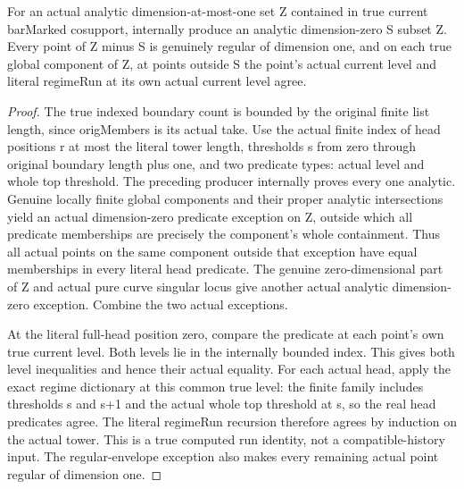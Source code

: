 \begin{theorem}
\label{hir:step-one-actual-curve-history-dimzero-exception}
\leanok
For an actual analytic dimension-at-most-one set Z contained in true current
barMarked cosupport, internally produce an analytic dimension-zero S subset Z.
Every point of Z minus S is genuinely regular of dimension one, and on each
true global component of Z, at points outside S the point's actual current level and literal
regimeRun at its own actual current level agree.
\end{theorem}
\begin{proof}
The true indexed boundary count is bounded by the original finite list length,
since origMembers is its actual take. Use the actual finite index of head
positions r at most the literal tower length, thresholds s from zero through
original boundary length plus one, and two predicate types: actual level and
whole top threshold. The preceding producer internally proves every one
analytic. Genuine locally finite global components and their proper analytic
intersections yield an actual dimension-zero predicate exception on Z, outside
which all predicate memberships are precisely the component's whole
containment. Thus all actual points on the same component outside that
exception have equal memberships in every literal head predicate. The genuine
zero-dimensional part of Z and actual pure curve singular locus give another
actual analytic dimension-zero exception. Combine the two actual exceptions.

At the literal full-head position zero, compare the predicate at each point's
own true current level. Both levels lie in the internally bounded index.
This gives both level inequalities and hence their actual equality. For each
actual head, apply the exact regime dictionary at this common true level:
the finite family includes thresholds s and s+1 and the actual whole top
threshold at s, so the real head predicates agree. The literal regimeRun
recursion therefore agrees by induction on the actual tower. This is a true
computed run identity, not a compatible-history input. The regular-envelope
exception also makes every remaining actual point regular of dimension one.
\end{proof}

